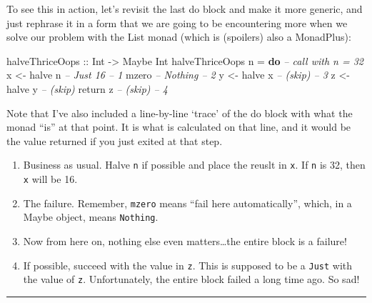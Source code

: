 \documentclass[]{article}
\newenvironment{Shaded}{}{}
\newcommand{\CommentTok}[1]{\textcolor[rgb]{0.38,0.63,0.69}{\textit{#1}}}
\newcommand{\DataTypeTok}[1]{\textcolor[rgb]{0.56,0.13,0.00}{#1}}
\newcommand{\FunctionTok}[1]{\textcolor[rgb]{0.02,0.16,0.49}{#1}}
\newcommand{\KeywordTok}[1]{\textcolor[rgb]{0.00,0.44,0.13}{\textbf{#1}}}
\newcommand{\NormalTok}[1]{#1}
\newcommand{\OtherTok}[1]{\textcolor[rgb]{0.00,0.44,0.13}{#1}}
\begin{document}
To see this in action, let's revisit the last do block and make it more generic,
and just rephrase it in a form that we are going to be encountering more when we
solve our problem with the List monad (which is (spoilers) also a MonadPlus):

\begin{Shaded}
\begin{Highlighting}[]
\OtherTok{halveThriceOops ::} \DataTypeTok{Int} \OtherTok{->} \DataTypeTok{Maybe} \DataTypeTok{Int}
\NormalTok{halveThriceOops n }\FunctionTok{=} \KeywordTok{do}          \CommentTok{-- call with n = 32}
\NormalTok{    x }\OtherTok{<-}\NormalTok{ halve n                }\CommentTok{-- Just 16              -- 1}
\NormalTok{    mzero                       }\CommentTok{-- Nothing              -- 2}
\NormalTok{    y }\OtherTok{<-}\NormalTok{ halve x                }\CommentTok{-- (skip)               -- 3}
\NormalTok{    z }\OtherTok{<-}\NormalTok{ halve y                }\CommentTok{-- (skip)}
\NormalTok{    return z                    }\CommentTok{-- (skip)               -- 4}
\end{Highlighting}
\end{Shaded}

Note that I've also included a line-by-line `trace' of the do block with what
the monad ``is'' at that point. It is what is calculated on that line, and it
would be the value returned if you just exited at that step.

\begin{enumerate}
\def\labelenumi{\arabic{enumi}.}
\tightlist
\item
  Business as usual. Halve \texttt{n} if possible and place the reuslt in
  \texttt{x}. If \texttt{n} is 32, then \texttt{x} will be 16.
\item
  The failure. Remember, \texttt{mzero} means ``fail here automatically'',
  which, in a Maybe object, means \texttt{Nothing}.
\item
  Now from here on, nothing else even matters\ldots{}the entire block is a
  failure!
\item
  If possible, succeed with the value in \texttt{z}. This is supposed to be a
  \texttt{Just} with the value of \texttt{z}. Unfortunately, the entire block
  failed a long time ago. So sad!
\end{enumerate}

\begin{center}\rule{0.5\linewidth}{\linethickness}\end{center}
\end{document}
